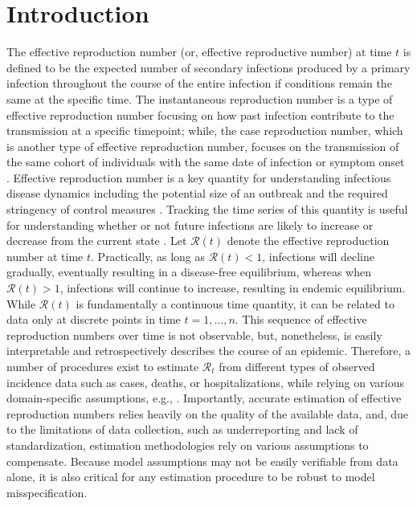 \documentclass[10pt,letterpaper]{article}
\def\calR{\mathcal{R}}
\newcommand{\citep}[1]{\cite{#1}}
\begin{document}
\linenumbers

\section{Introduction}
\label{sec:intro}

The effective reproduction number (or, effective reproductive number) at time
$\textit{t}$ is defined to be the expected number of secondary infections produced 
by a primary infection throughout the course of the entire infection if conditions 
remain the same at the specific time. The instantaneous reproduction number is 
a type of effective reproduction number focusing on how past 
infection contribute to the transmission at a specific timepoint; while, the case 
reproduction number, which is another type of effective reproduction number,
focuses on the transmission of the same cohort of individuals with the same date 
of infection or symptom onset \citep{gostic2020practical}. 
Effective reproduction number is a key quantity 
for understanding infectious disease dynamics including the potential size of an
outbreak and the required stringency of control measures \citep{nishiura2009effective,fraser2007estimating}. Tracking the time
series of this quantity is useful for understanding whether or not
future infections are likely to increase or decrease from the current state \citep{anderson1991infectious}. Let
$\calR(t)$ denote the effective reproduction number at time $t$. Practically, as
long as $\calR(t) < 1$, infections will decline gradually, eventually resulting
in a disease-free equilibrium, whereas when $\calR(t) > 1$, infections will
continue to increase, resulting in endemic equilibrium. While $\calR(t)$ is
fundamentally a continuous time quantity, it can be related to data only at
discrete points in time $t = 1,\ldots,n$. This sequence of effective
reproduction numbers over time is not observable, but, nonetheless, is easily
interpretable and retrospectively describes the course of an epidemic.
Therefore, a number of procedures exist to estimate $\calR_t$ from different
types of observed incidence data such as cases, deaths, or hospitalizations,
while relying on various domain-specific assumptions, e.g., 
\cite{wallinga2004different,hao2020reconstruction,goldstein2023semiparametric,goldstein2024incorporating}. 
Importantly, accurate
estimation of effective reproduction numbers relies heavily on the quality of
the available data, and, due to the limitations of data collection, such as
underreporting and lack of standardization, estimation methodologies rely on
various assumptions to compensate. Because model assumptions may not be easily
verifiable from data alone, it is also critical for any estimation procedure to
be robust to model misspecification. 
\end{document}

